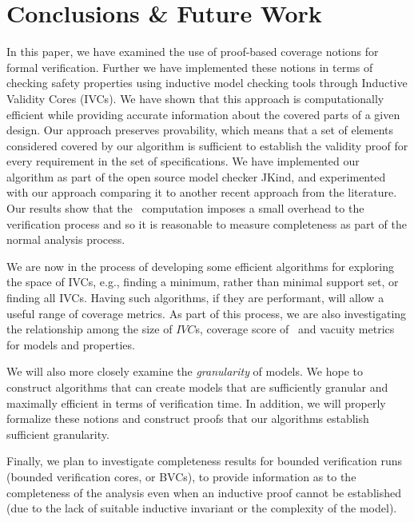 \section{Conclusions \& Future Work}
\label{sec:conclusion}

In this paper, we have examined the use of proof-based coverage notions for formal verification.
Further we have implemented these notions in terms of checking safety properties using inductive model checking tools through Inductive Validity Cores (IVCs).  We have shown that this approach
is computationally efficient while providing accurate information about the covered parts of a given design.  Our approach preserves provability, which means that a set of elements considered covered by our algorithm is sufficient to establish the validity proof for every requirement in the set of specifications.
%
We have implemented our algorithm as part of the open source model checker JKind, and experimented with our approach comparing it to another recent approach from the literature.  Our results show that the \ucalg\ computation imposes a small overhead to the verification process and so it is reasonable to measure completeness as part of the normal analysis process.

We are now in the process of developing some efficient algorithms for exploring the space of IVCs, e.g., finding a minimum, rather than minimal support set, or finding all IVCs.  Having such algorithms, if they are performant, will allow a useful range of coverage metrics.  As part of this process, we are also investigating the relationship among the size of $IVC$s, coverage score of \ivccov\, and vacuity metrics for models and properties.

We will also more closely examine the {\em granularity} of models.  We hope to construct algorithms that can create models that are sufficiently granular and maximally efficient in terms of verification time.  In addition, we will properly formalize these notions and construct proofs that our algorithms establish sufficient granularity.

Finally, we plan to investigate completeness results for bounded verification runs (bounded verification cores, or BVCs), to provide information as to the completeness of the analysis even when an inductive proof cannot be established (due to the lack of suitable inductive invariant or the complexity of the model).

